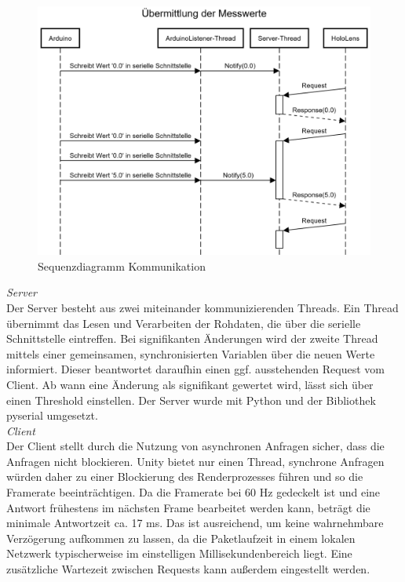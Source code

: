 \begin{figure}[h!]
	\centering
	\includegraphics[width=1\textwidth]{images/Sequenzdiagramm.png}
	\caption{Sequenzdiagramm Kommunikation}
	\label{img:Sequenzdiagramm}
\end{figure}

\textit{Server}\\
Der Server besteht aus zwei miteinander kommunizierenden Threads. Ein Thread übernimmt das Lesen und Verarbeiten der Rohdaten, die über die serielle Schnittstelle eintreffen. Bei signifikanten Änderungen wird der zweite Thread mittels einer gemeinsamen, synchronisierten Variablen über die neuen Werte informiert. Dieser beantwortet daraufhin einen ggf. ausstehenden Request vom Client. Ab wann eine Änderung als signifikant gewertet wird, lässt sich über einen Threshold einstellen. Der Server wurde mit Python und der Bibliothek pyserial umgesetzt.\\

\textit{Client}\\
Der Client stellt durch die Nutzung von asynchronen Anfragen sicher, dass die Anfragen nicht blockieren. Unity bietet nur einen Thread, synchrone Anfragen würden daher zu einer Blockierung des Renderprozesses führen und so die Framerate beeinträchtigen. Da die Framerate bei 60 Hz gedeckelt ist und eine Antwort frühestens im nächsten Frame bearbeitet werden kann, beträgt die minimale Antwortzeit ca. 17 ms. Das ist ausreichend, um keine wahrnehmbare Verzögerung aufkommen zu lassen, da die Paketlaufzeit in einem lokalen Netzwerk typischerweise im einstelligen Millisekundenbereich liegt. Eine zusätzliche Wartezeit zwischen Requests kann außerdem eingestellt werden.\\

